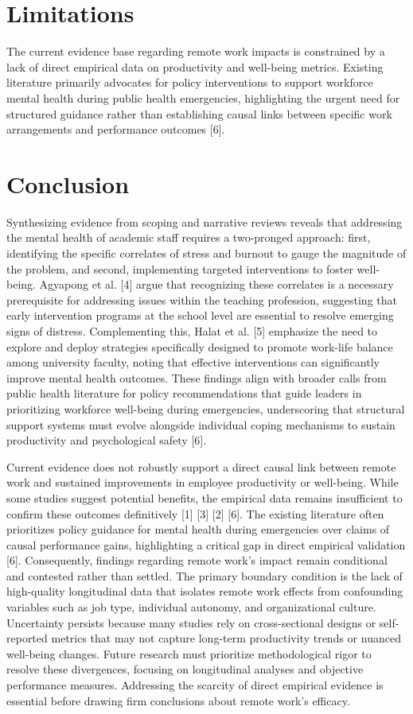 \documentclass[11pt]{article}
\begin{document}
\section{Limitations}
The current evidence base regarding remote work impacts is constrained by a lack of direct empirical data on productivity and well-being metrics. Existing literature primarily advocates for policy interventions to support workforce mental health during public health emergencies, highlighting the urgent need for structured guidance rather than establishing causal links between specific work arrangements and performance outcomes [6].

\section{Conclusion}
Synthesizing evidence from scoping and narrative reviews reveals that addressing the mental health of academic staff requires a two-pronged approach: first, identifying the specific correlates of stress and burnout to gauge the magnitude of the problem, and second, implementing targeted interventions to foster well-being. Agyapong et al. [4] argue that recognizing these correlates is a necessary prerequisite for addressing issues within the teaching profession, suggesting that early intervention programs at the school level are essential to resolve emerging signs of distress. Complementing this, Halat et al. [5] emphasize the need to explore and deploy strategies specifically designed to promote work-life balance among university faculty, noting that effective interventions can significantly improve mental health outcomes. These findings align with broader calls from public health literature for policy recommendations that guide leaders in prioritizing workforce well-being during emergencies, underscoring that structural support systems must evolve alongside individual coping mechanisms to sustain productivity and psychological safety [6].

Current evidence does not robustly support a direct causal link between remote work and sustained improvements in employee productivity or well-being. While some studies suggest potential benefits, the empirical data remains insufficient to confirm these outcomes definitively [1] [3] [2] [6]. The existing literature often prioritizes policy guidance for mental health during emergencies over claims of causal performance gains, highlighting a critical gap in direct empirical validation [6]. Consequently, findings regarding remote work's impact remain conditional and contested rather than settled. The primary boundary condition is the lack of high-quality longitudinal data that isolates remote work effects from confounding variables such as job type, individual autonomy, and organizational culture. Uncertainty persists because many studies rely on cross-sectional designs or self-reported metrics that may not capture long-term productivity trends or nuanced well-being changes. Future research must prioritize methodological rigor to resolve these divergences, focusing on longitudinal analyses and objective performance measures. Addressing the scarcity of direct empirical evidence is essential before drawing firm conclusions about remote work's efficacy.
\end{document}

